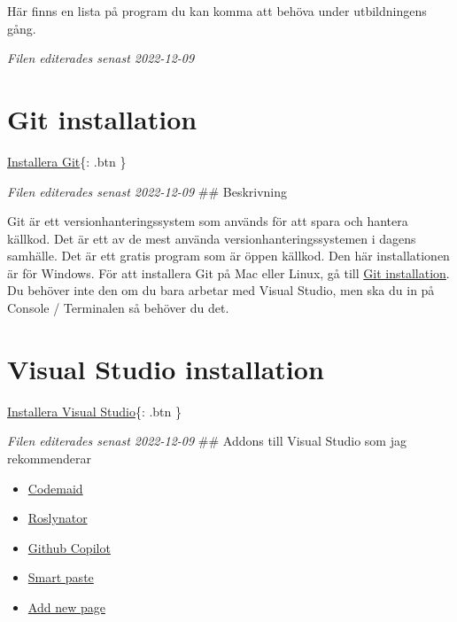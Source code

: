 Här finns en lista på program du kan komma att behöva under
utbildningens gång.

\emph{Filen editerades senast 2022-12-09}

\hypertarget{git-installation}{%
\section{Git installation}\label{git-installation}}

\href{https://git-scm.com/}{Installera Git}\{: .btn \}

\emph{Filen editerades senast 2022-12-09} \#\# Beskrivning

Git är ett versionhanteringssystem som används för att spara och hantera
källkod. Det är ett av de mest använda versionhanteringssystemen i
dagens samhälle. Det är ett gratis program som är öppen källkod. Den här
installationen är för Windows. För att installera Git på Mac eller
Linux, gå till
\href{https://git-scm.com/book/en/v2/Getting-Started-Installing-Git}{Git
installation}. Du behöver inte den om du bara arbetar med Visual Studio,
men ska du in på Console / Terminalen så behöver du det.

\hypertarget{visual-studio-installation}{%
\section{Visual Studio installation}\label{visual-studio-installation}}

\href{https://visualstudio.microsoft.com/}{Installera Visual Studio}\{:
.btn \}

\emph{Filen editerades senast 2022-12-09} \#\# Addons till Visual Studio
som jag rekommenderar

\begin{itemize}
\tightlist
\item
  \href{https://marketplace.visualstudio.com/items?itemName=SteveCadwallader.CodeMaidVS2022}{Codemaid}
\item
  \href{https://marketplace.visualstudio.com/items?itemName=josefpihrt.Roslynator2022}{Roslynator}
\item
  \href{https://marketplace.visualstudio.com/items?itemName=GitHub.copilotvs}{Github
  Copilot}
\item
  \href{https://marketplace.visualstudio.com/items?itemName=martinw.SmartPaster}{Smart
  paste}
\item
  \href{https://marketplace.visualstudio.com/items?itemName=MadsKristensen.AddNewFile}{Add
  new page}
\end{itemize}

